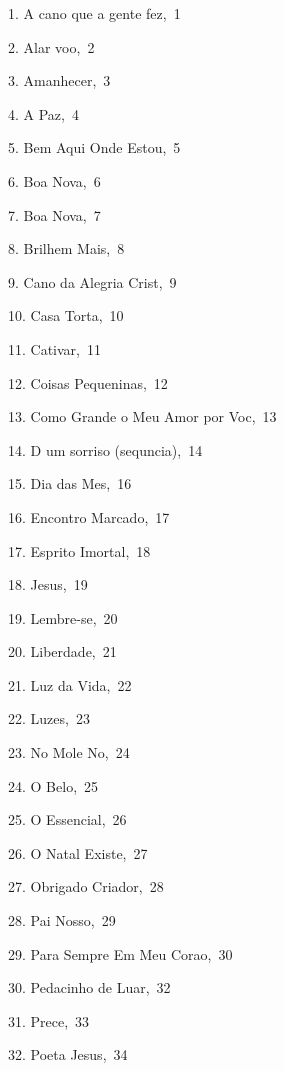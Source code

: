 \item\ 1. A cano que a gente fez\hbox {, 1}
\item\ 2. Alar voo\hbox {, 2}
\item\ 3. Amanhecer\hbox {, 3}
\item\ 4. A Paz\hbox {, 4}
\item\ 5. Bem Aqui Onde Estou\hbox {, 5}
\item\ 6. Boa Nova\hbox {, 6}
\item\ 7. Boa Nova\hbox {, 7}
\item\ 8. Brilhem Mais\hbox {, 8}
\item\ 9. Cano da Alegria Crist\hbox {, 9}
\item\ 10. Casa Torta\hbox {, 10}
\item\ 11. Cativar\hbox {, 11}
\item\ 12. Coisas Pequeninas\hbox {, 12}
\item\ 13. Como  Grande o Meu Amor por Voc\hbox {, 13}
\item\ 14. D um sorriso (sequncia)\hbox {, 14}
\item\ 15. Dia das Mes\hbox {, 16}
\item\ 16. Encontro Marcado\hbox {, 17}
\item\ 17. Esp\IeC {\'\i }rito Imortal\hbox {, 18}
\item\ 18. Jesus\hbox {, 19}
\item\ 19. Lembre-se\hbox {, 20}
\item\ 20. Liberdade\hbox {, 21}
\item\ 21. Luz da Vida\hbox {, 22}
\item\ 22. Luzes\hbox {, 23}
\item\ 23. No  Mole No\hbox {, 24}
\item\ 24. O Belo\hbox {, 25}
\item\ 25. O Essencial\hbox {, 26}
\item\ 26. O Natal Existe\hbox {, 27}
\item\ 27. Obrigado Criador\hbox {, 28}
\item\ 28. Pai Nosso\hbox {, 29}
\item\ 29. Para Sempre Em Meu Corao\hbox {, 30}
\item\ 30. Pedacinho de Luar\hbox {, 32}
\item\ 31. Prece\hbox {, 33}
\item\ 32. Poeta Jesus\hbox {, 34}
